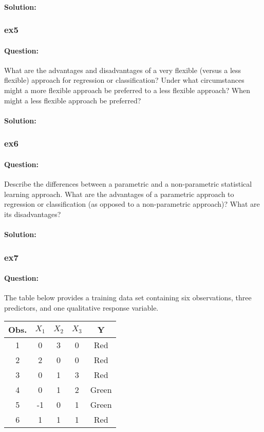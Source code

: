 \documentclass[a4paper,12pt,titlepage]{article} %
\begin{document}
\paragraph{Solution:}

\subsubsection{ex5}
\paragraph{Question:} What are the advantages and disadvantages of a very flexible (versus a less flexible) approach for regression or classification? Under what circumstances might a more flexible approach be preferred to a less flexible approach? When might a less flexible approach be preferred?

\paragraph{Solution:}

\subsubsection{ex6}
\paragraph{Question:} Describe the differences between a parametric and a non-parametric statistical learning approach. What are the advantages of a parametric approach to regression or classification (as opposed to a non-parametric approach)? What are its disadvantages?

\paragraph{Solution:}

\subsubsection{ex7}
\paragraph{Question:} The table below provides a training data set containing six observations, three predictors, and one qualitative response variable.

\begin{center}
	\begin{tabular}{c|cccc}
		\hline
		Obs.& $X_{1}$ & $X_{2}$ & $X_{3}$ & Y \\
		\hline
		1 & 0 & 3 & 0 & Red \\
		2 & 2 & 0 & 0 & Red \\
		3 & 0 & 1 & 3 & Red \\
		4 & 0 & 1 & 2 & Green \\
		5 & -1 & 0 & 1 & Green \\
		6 & 1 & 1 & 1 & Red \\
		\hline
	\end{tabular}
\end{center}
\end{document}
